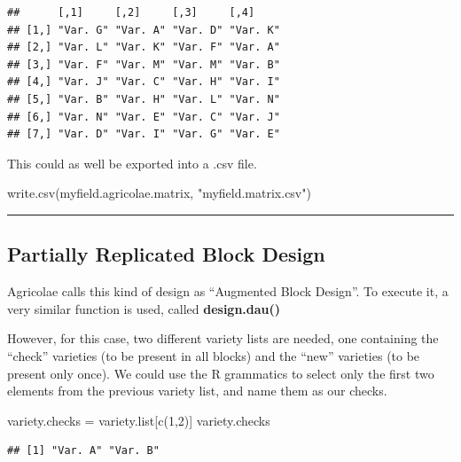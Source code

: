 \documentclass[
]{book}
\newenvironment{Shaded}{\begin{snugshade}}{\end{snugshade}}
\newcommand{\DecValTok}[1]{\textcolor[rgb]{0.00,0.00,0.81}{#1}}
\newcommand{\FunctionTok}[1]{\textcolor[rgb]{0.00,0.00,0.00}{#1}}
\newcommand{\NormalTok}[1]{#1}
\newcommand{\OtherTok}[1]{\textcolor[rgb]{0.56,0.35,0.01}{#1}}
\newcommand{\StringTok}[1]{\textcolor[rgb]{0.31,0.60,0.02}{#1}}
\begin{document}
\begin{verbatim}
##      [,1]     [,2]     [,3]     [,4]    
## [1,] "Var. G" "Var. A" "Var. D" "Var. K"
## [2,] "Var. L" "Var. K" "Var. F" "Var. A"
## [3,] "Var. F" "Var. M" "Var. M" "Var. B"
## [4,] "Var. J" "Var. C" "Var. H" "Var. I"
## [5,] "Var. B" "Var. H" "Var. L" "Var. N"
## [6,] "Var. N" "Var. E" "Var. C" "Var. J"
## [7,] "Var. D" "Var. I" "Var. G" "Var. E"
\end{verbatim}

This could as well be exported into a .csv file.

\begin{Shaded}
\begin{Highlighting}[]
\FunctionTok{write.csv}\NormalTok{(myfield.agricolae.matrix, }\StringTok{"myfield.matrix.csv"}\NormalTok{)}
\end{Highlighting}
\end{Shaded}

\begin{center}\rule{0.5\linewidth}{0.5pt}\end{center}

\hypertarget{partially-replicated-block-design-1}{%
\subsection{Partially Replicated Block Design}\label{partially-replicated-block-design-1}}

Agricolae calls this kind of design as ``Augmented Block Design''. To execute it, a very similar function is used, called \textbf{design.dau()}

However, for this case, two different variety lists are needed, one containing the ``check'' varieties (to be present in all blocks) and the ``new'' varieties (to be present only once). We could use the R grammatics to select only the first two elements from the previous variety list, and name them as our checks.

\begin{Shaded}
\begin{Highlighting}[]
\NormalTok{variety.checks }\OtherTok{=}\NormalTok{ variety.list[}\FunctionTok{c}\NormalTok{(}\DecValTok{1}\NormalTok{,}\DecValTok{2}\NormalTok{)]}
\NormalTok{variety.checks}
\end{Highlighting}
\end{Shaded}

\begin{verbatim}
## [1] "Var. A" "Var. B"
\end{verbatim}
\end{document}
